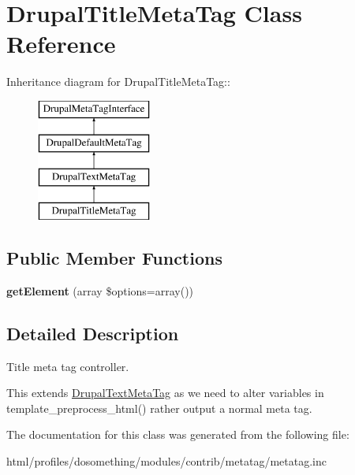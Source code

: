 \hypertarget{classDrupalTitleMetaTag}{
\section{DrupalTitleMetaTag Class Reference}
\label{classDrupalTitleMetaTag}
}
Inheritance diagram for DrupalTitleMetaTag::\begin{figure}[H]
\begin{center}
\leavevmode
\includegraphics[height=4cm]{classDrupalTitleMetaTag}
\end{center}
\end{figure}
\subsection*{Public Member Functions}
\begin{DoxyCompactItemize}
\item 
\hypertarget{classDrupalTitleMetaTag_a319f36b2164ca9b3c2997c974da70da8}{
{\bfseries getElement} (array \$options=array())}
\label{classDrupalTitleMetaTag_a319f36b2164ca9b3c2997c974da70da8}

\end{DoxyCompactItemize}


\subsection{Detailed Description}
Title meta tag controller.

This extends \hyperlink{classDrupalTextMetaTag}{DrupalTextMetaTag} as we need to alter variables in template\_\-preprocess\_\-html() rather output a normal meta tag. 

The documentation for this class was generated from the following file:\begin{DoxyCompactItemize}
\item 
html/profiles/dosomething/modules/contrib/metatag/metatag.inc\end{DoxyCompactItemize}
